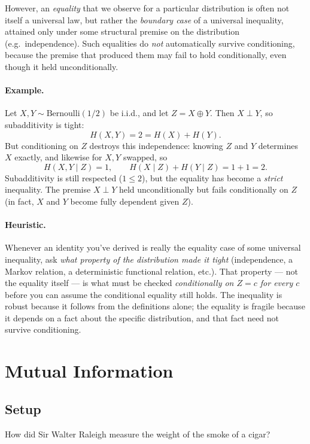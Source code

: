 \documentclass{article}
\begin{document}
However, an \emph{equality} that we observe for a particular distribution is
often not itself a universal law, but rather the \emph{boundary case} of a
universal inequality, attained only under some structural premise on the
distribution (e.g.\ independence). Such equalities do \emph{not} automatically
survive conditioning, because the premise that produced them may fail to hold
conditionally, even though it held unconditionally.

\paragraph{Example.} Let $X,Y\sim\mathrm{Bernoulli}(1/2)$ be i.i.d., and let
$Z = X\oplus Y$. Then $X\perp Y$, so subadditivity is tight:
\[
H(X,Y) = 2 = H(X) + H(Y).
\]
But conditioning on $Z$ destroys this independence: knowing $Z$ and $Y$
determines $X$ exactly, and likewise for $X,Y$ swapped, so
\[
H(X,Y\mid Z) = 1, \qquad H(X\mid Z) + H(Y\mid Z) = 1+1 = 2.
\]
Subadditivity is still respected ($1\leq 2$), but the equality has become a
\emph{strict} inequality. The premise $X\perp Y$ held unconditionally but
fails conditionally on $Z$ (in fact, $X$ and $Y$ become fully dependent given
$Z$).

\paragraph{Heuristic.} Whenever an identity you've derived is really the
equality case of some universal inequality, ask \emph{what property of the
distribution made it tight} (independence, a Markov relation, a deterministic
functional relation, etc.). That property --- not the equality itself --- is
what must be checked \emph{conditionally on $Z=c$ for every $c$} before you
can assume the conditional equality still holds. The inequality is robust
because it follows from the definitions alone; the equality is fragile
because it depends on a fact about the specific distribution, and that fact
need not survive conditioning.

\section{Mutual Information}

\subsection{Setup}

How did Sir Walter Raleigh measure the weight of the smoke of a cigar?
\end{document}
